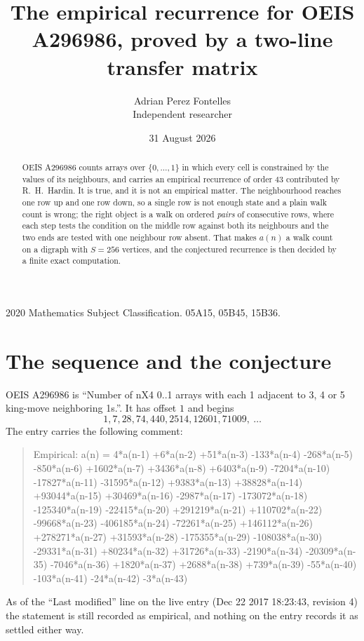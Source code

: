 \documentclass[11pt,a4paper]{article}
\title{The empirical recurrence for OEIS A296986, proved by a two-line transfer matrix}
\author{Adrian Perez Fontelles\\ \small Independent researcher}
\date{31 August 2026}
\theoremstyle{plain}
\theoremstyle{definition}
\begin{document}
\maketitle

\begin{abstract}
OEIS A296986 counts arrays over $\{0,\dots,1\}$ in which every cell is constrained by the
values of its neighbours, and carries an empirical recurrence of order $43$ contributed
by R.~H.~Hardin. It is true, and it is not an empirical matter. The neighbourhood reaches one
row up and one row down, so a single row is not enough state and a plain walk count
is wrong; the right object is a walk on ordered \emph{pairs} of consecutive rows, where
each step tests the condition on the middle row against both its neighbours and the two
ends are tested with one neighbour row absent. That makes $a(n)$ a walk count on a digraph
with $S=256$ vertices, and the conjectured recurrence is then decided by a finite exact
computation.
\end{abstract}

\noindent\small 2020 Mathematics Subject Classification. 05A15, 05B45, 15B36.\normalsize

\section{The sequence and the conjecture}

OEIS A296986 is ``Number of nX4 0..1 arrays with each 1 adjacent to 3, 4 or 5 king-move neighboring 1s.''. It has offset $1$ and begins
\[
1, 7, 28, 74, 440, 2514, 12601, 71009,\ \dots
\]
The entry carries the following comment:
\begin{quote}\small
Empirical: a(n) = 4*a(n-1) +6*a(n-2) +51*a(n-3) -133*a(n-4) -268*a(n-5) -850*a(n-6) +1602*a(n-7) +3436*a(n-8) +6403*a(n-9) -7204*a(n-10) -17827*a(n-11) -31595*a(n-12) +9383*a(n-13) +38828*a(n-14) +93044*a(n-15) +30469*a(n-16) -2987*a(n-17) -173072*a(n-18) -125340*a(n-19) -22415*a(n-20) +291219*a(n-21) +110702*a(n-22) -99668*a(n-23) -406185*a(n-24) -72261*a(n-25) +146112*a(n-26) +278271*a(n-27) +31593*a(n-28) -175355*a(n-29) -108038*a(n-30) -29331*a(n-31) +80234*a(n-32) +31726*a(n-33) -2190*a(n-34) -20309*a(n-35) -7046*a(n-36) +1820*a(n-37) +2688*a(n-38) +739*a(n-39) -55*a(n-40) -103*a(n-41) -24*a(n-42) -3*a(n-43)
\end{quote}
As of the ``Last modified'' line on the live entry (Dec 22 2017 18:23:43, revision 4) the statement is
still recorded as empirical, and nothing on the entry records it as settled either way.
\end{document}
